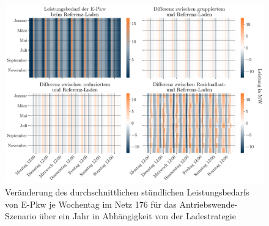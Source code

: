 \begin{figure}[H]
    \centering
    \includegraphics[width=\textwidth]{Bilder/residual_load_diff}
    \caption{Veränderung des durchschnittlichen stündlichen Leistungsbedarfs von E-Pkw je Wochentag im Netz \num{176} für das Antriebswende-Szenario über ein Jahr in Abhängigkeit von der Ladestrategie}\label{fig:residual_load_diff}
\end{figure}